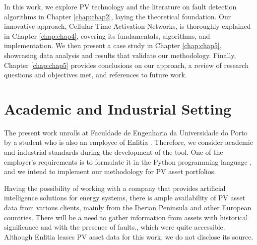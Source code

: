 In this work, we explore PV technology and the literature on fault detection algorithms in Chapter \ref{chap:chap2}, laying the theoretical foundation. Our innovative approach, Cellular Time Activation Networks, is thoroughly explained in Chapter \ref{chap:chap4}, covering its fundamentals, algorithms, and implementation. We then present a case study in Chapter \ref{chap:chap5}, showcasing data analysis and results that validate our methodology. Finally, Chapter \ref{chap:chap5} provides conclusions on our approach, a review of research questions and objectives met, and references to future work.


\section{Academic and Industrial Setting}

The present work unrolls at Faculdade de Engenharia da Universidade do Porto by a student who is also an employee of Enlitia \cite{EL}. Therefore, we consider academic and industrial standards during the development of the tool. One of the employer's requirements is to formulate it in the Python programming language \cite{Python}, and we intend to implement our methodology for PV asset portfolios. 

Having the possibility of working with a company that provides artificial intelligence solutions for energy systems, there is ample availability of PV asset data from various clients, mainly from the Iberian Peninsula and other European countries. There will be a need to gather information from assets with historical significance and with the presence of faults., which were quite accessible. Although Enlitia leases PV asset data for this work, we do not disclose its source.
